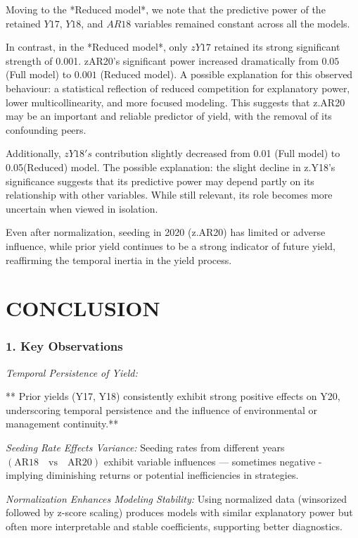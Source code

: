 \documentclass[
]{article}
\begin{document}
{\bfseries

Moving to the *Reduced model*, we note that the predictive power of the retained $Y17$, $Y18$, and $AR18$ variables remained constant across all the models.

In contrast, in the *Reduced model*, only $zY17$ retained its strong significant strength of 0.001.   zAR20's significant power increased dramatically from $0.05$ (Full model) to $0.001$ (Reduced model). A possible explanation for this observed behaviour: a statistical reflection of reduced competition for explanatory power, lower multicollinearity, and more focused modeling. This suggests that z.AR20 may be an important and reliable predictor of yield, with the removal of its confounding peers.

Additionally, $zY18's$ contribution slightly decreased from 0.01 (Full model) to 0.05(Reduced) model. The possible explanation: the slight decline in z.Y18’s significance suggests that its predictive power may depend partly on its relationship with other variables. While still relevant, its role becomes more uncertain when viewed in isolation.

Even after normalization, seeding in 2020 (z.AR20) has limited or adverse influence, while prior yield continues to be a strong indicator of future yield, reaffirming the temporal inertia in the yield process.
}

\section{CONCLUSION}\label{conclusion}

\subsubsection{1. Key Observations}\label{key-observations}

\emph{Temporal Persistence of Yield:}

** Prior yields (Y17, Y18) consistently exhibit strong positive effects
on Y20, underscoring temporal persistence and the influence of
environmental or management continuity.**

\emph{Seeding Rate Effects Variance:} Seeding rates from different years
\((\text{AR18}\quad \text{vs}\quad \text{AR20})\) exhibit variable
influences --- sometimes negative - implying diminishing returns or
potential inefficiencies in strategies.

\emph{Normalization Enhances Modeling Stability:} Using normalized data
(winsorized followed by z-score scaling) produces models with similar
explanatory power but often more interpretable and stable coefficients,
supporting better diagnostics.
\end{document}
